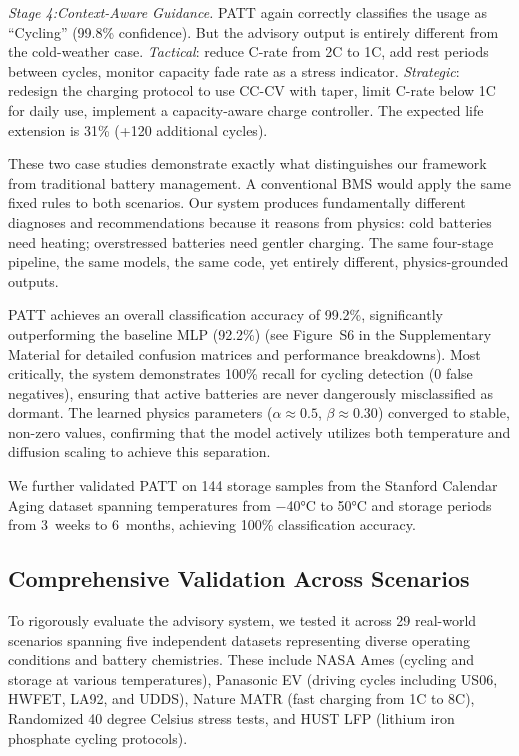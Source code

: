\documentclass[5p,times,authoryear]{elsarticle}
\begin{document}
\emph{Stage 4:Context-Aware Guidance.} PATT again correctly classifies the usage as ``Cycling'' (99.8\% confidence). But the advisory output is entirely different from the cold-weather case. \emph{Tactical}: reduce C-rate from 2C to 1C, add rest periods between cycles, monitor capacity fade rate as a stress indicator. \emph{Strategic}: redesign the charging protocol to use CC-CV with taper, limit C-rate below 1C for daily use, implement a capacity-aware charge controller. The expected life extension is 31\% (+120 additional cycles).

 These two case studies demonstrate exactly what distinguishes our framework from traditional battery management. A conventional BMS would apply the same fixed rules to both scenarios. Our system produces fundamentally different diagnoses and recommendations because it reasons from physics: cold batteries need heating; overstressed batteries need gentler charging. The same four-stage pipeline, the same models, the same code, yet entirely different, physics-grounded outputs.



PATT achieves an overall classification accuracy of 99.2\%, significantly outperforming the baseline MLP (92.2\%) (see Figure~S6 in the Supplementary Material for detailed confusion matrices and performance breakdowns). Most critically, the system demonstrates 100\% recall for cycling detection (0 false negatives), ensuring that active batteries are never dangerously misclassified as dormant. The learned physics parameters ($\alpha \approx 0.5$, $\beta \approx 0.30$) converged to stable, non-zero values, confirming that the model actively utilizes both temperature and diffusion scaling to achieve this separation.


We further validated PATT on 144 storage samples from the Stanford Calendar Aging dataset spanning temperatures from $-$40°C to 50°C and storage periods from 3~weeks to 6~months, achieving 100\% classification accuracy.

\subsection{Comprehensive Validation Across Scenarios}

To rigorously evaluate the advisory system, we tested it across 29 real-world scenarios spanning five independent datasets representing diverse operating conditions and battery chemistries. These include NASA Ames (cycling and storage at various temperatures), Panasonic EV (driving cycles including US06, HWFET, LA92, and UDDS), Nature MATR (fast charging from 1C to 8C), Randomized 40 degree Celsius stress tests, and HUST LFP (lithium iron phosphate cycling protocols).
\end{document}
